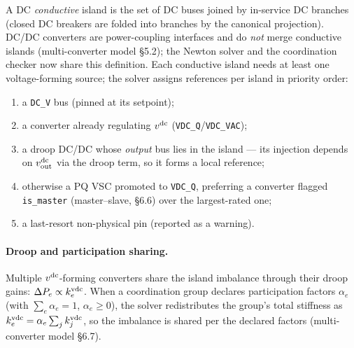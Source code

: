 A DC \emph{conductive} island is the set of DC buses joined by in-service DC
branches (closed DC breakers are folded into branches by the canonical
projection).  DC/DC converters are power-coupling interfaces and do \emph{not}
merge conductive islands (multi-converter model \S5.2); the Newton solver and
the coordination checker now share this definition.  Each conductive island
needs at least one voltage-forming source; the solver assigns references per
island in priority order:
\begin{enumerate}
  \item a \texttt{DC\_V} bus (pinned at its setpoint);
  \item a converter already regulating \(v^{\mathrm{dc}}\) (\texttt{VDC\_Q}/\texttt{VDC\_VAC});
  \item a droop DC/DC whose \emph{output} bus lies in the island --- its
    injection depends on \(v^{\mathrm{dc}}_{\mathrm{out}}\) via the droop term, so it
    forms a local reference;
  \item otherwise a PQ VSC promoted to \texttt{VDC\_Q}, preferring a converter
    flagged \texttt{is\_master} (master--slave, \S6.6) over the largest-rated one;
  \item a last-resort non-physical pin (reported as a warning).
\end{enumerate}

\paragraph{Droop and participation sharing.}
Multiple \(v^{\mathrm{dc}}\)-forming converters share the island imbalance through
their droop gains: \(\Delta P_e \propto k^{\mathrm{vdc}}_e\).  When a coordination
group declares participation factors \(\alpha_e\) (with \(\sum_e \alpha_e = 1\),
\(\alpha_e \ge 0\)), the solver redistributes the group's total stiffness as
\(k^{\mathrm{vdc}}_e = \alpha_e \sum_j k^{\mathrm{vdc}}_j\), so the imbalance is
shared per the declared factors (multi-converter model \S6.7).

